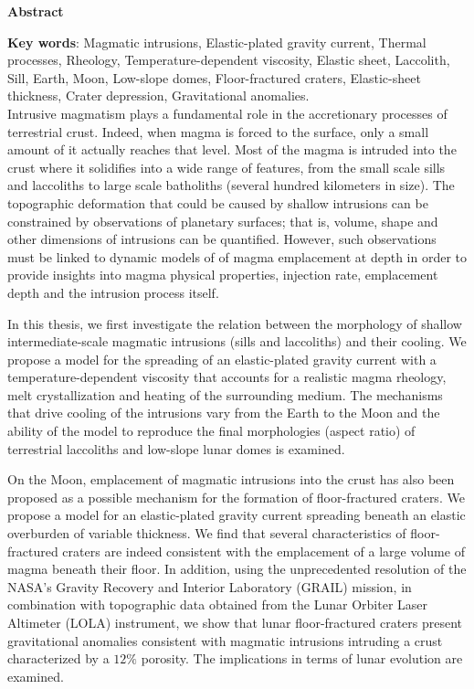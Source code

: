 \thispagestyle{fancy}
\begin{center}
    \Large
    \textbf{Abstract}
\end{center}

\textbf{Key words}: Magmatic intrusions, Elastic-plated gravity
current, Thermal processes, Rheology, Temperature-dependent viscosity,
Elastic  sheet,   Laccolith,  Sill,  Earth,  Moon,   Low-slope  domes,
Floor-fractured craters, Elastic-sheet thickness, Crater depression,
Gravitational anomalies.\\

Intrusive  magmatism  plays a  fundamental  role  in the  accretionary
processes of terrestrial  crust.  Indeed, when magma is  forced to the
surface, only a small amount of  it actually reaches that level.  Most
of the  magma is intruded  into the crust  where it solidifies  into a
wide range of  features, from the small scale sills  and laccoliths to
large  scale  batholiths (several  hundred  kilometers  in size).  The
topographic deformation that could be caused by shallow intrusions can
be constrained by observations of planetary surfaces; that is, volume,
shape and other dimensions of  intrusions can be quantified.  However,
such  observations  must be  linked  to  dynamic  models of  of  magma
emplacement at depth in order  to provide insights into magma physical
properties,  injection  rate,  emplacement  depth  and  the  intrusion
process itself.

In  this  thesis,  we  first  investigate  the  relation  between  the
morphology  of shallow  intermediate-scale magmatic  intrusions (sills
and  laccoliths)  and their  cooling.   We  propose  a model  for  the
spreading   of    an   elastic-plated    gravity   current    with   a
temperature-dependent viscosity  that accounts  for a  realistic magma
rheology, melt crystallization and  heating of the surrounding medium.
The  mechanisms that  drive cooling  of the  intrusions vary  from the
Earth to the Moon and the ability  of the model to reproduce the final
morphologies (aspect  ratio) of  terrestrial laccoliths  and low-slope
lunar domes is examined.

On the  Moon, emplacement  of magmatic intrusions  into the  crust has
also  been proposed  as  a  possible mechanism  for  the formation  of
floor-fractured  craters.  We  propose a  model for  an elastic-plated
gravity current  spreading beneath  an elastic overburden  of variable
thickness.  We  find that  several characteristics  of floor-fractured
craters are indeed  consistent with the emplacement of  a large volume
of magma  beneath their floor.   In addition, using  the unprecedented
resolution  of the  NASA's  Gravity Recovery  and Interior  Laboratory
(GRAIL) mission,  in combination  with topographic data  obtained from
the  Lunar Orbiter  Laser Altimeter  (LOLA) instrument,  we show  that
lunar   floor-fractured   craters  present   gravitational   anomalies
consistent with magmatic intrusions intruding a crust characterized by
a $12\%$  porosity. The implications  in terms of lunar  evolution are
examined.

